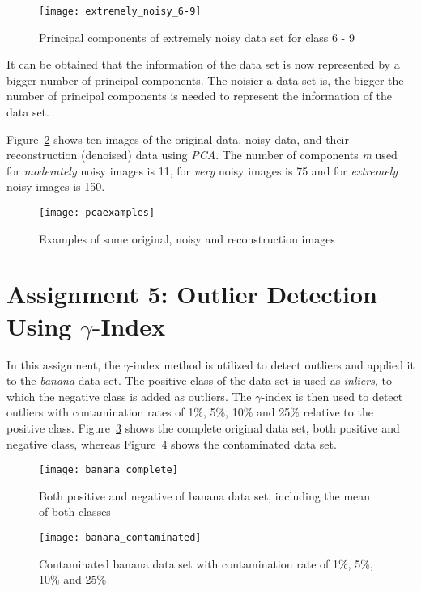 \begin{figure}[h!]
	\centering
	\texttt{[image: extremely\_noisy\_6-9]}
	\caption{Principal components of extremely noisy data set for class 6 - 9}
	\label{fig:pcaExtreme69}
\end{figure}

It can be obtained that the information of the data set is now represented by a bigger number of principal components. The noisier a data set is, the bigger the number of principal components is needed to represent the information of the data set.

Figure~\ref{fig:pcaExamples} shows ten images of the original data, noisy data, and their reconstruction (denoised) data using \textit{PCA}. The number of components \textit{m} used for \textit{moderately} noisy images is 11, for \textit{very} noisy images is 75 and for \textit{extremely} noisy images is 150.

\begin{figure}[h!]
	\centering
	\texttt{[image: pcaexamples]}
	\caption{Examples of some original, noisy and reconstruction images}
	\label{fig:pcaExamples}
\end{figure}

\section{Assignment 5: Outlier Detection Using $\gamma$-Index}
\label{assignment5}

In this assignment, the $\gamma$-index method is utilized to detect outliers and applied it to the \textit{banana} data set. The positive class of the data set is used as \textit{inliers}, to which the negative class is added as outliers. The $\gamma$-index is then used to detect outliers with contamination rates of 1\%, 5\%, 10\% and 25\% relative to the positive class. Figure~\ref{fig:bananacomplete} shows the complete original data set, both positive and negative class, whereas Figure~\ref{fig:bananacontaminated} shows the contaminated data set.

\begin{figure}[h!]
	\centering
	\texttt{[image: banana\_complete]}
	\caption{Both positive and negative of banana data set, including the mean of both classes}
	\label{fig:bananacomplete}
\end{figure}

\begin{figure}[h!]
	\centering
	\texttt{[image: banana\_contaminated]}
	\caption{Contaminated banana data set with contamination rate of 1\%, 5\%, 10\% and 25\%}
	\label{fig:bananacontaminated}
\end{figure}

